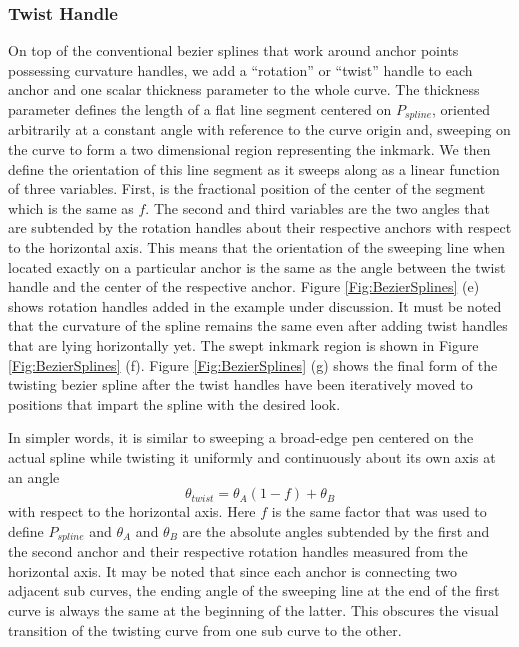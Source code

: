 \subsubsection{Twist Handle}
    On top of the conventional bezier splines that work around anchor points possessing curvature handles, we add a ``rotation'' or ``twist'' handle to each anchor and one scalar thickness parameter to the whole curve. The thickness parameter defines the length of a flat line segment centered on $P_{spline}$, oriented arbitrarily at a constant angle with reference to the curve origin and, sweeping on the curve to form a two dimensional region representing the inkmark. We then define the orientation of this line segment as it sweeps along as a linear function of three variables. First, is the fractional position of the center of the segment which is the same as $f$. The second and third variables are the two angles that are subtended by the rotation handles about their respective anchors with respect to the horizontal axis. This means that the orientation of the sweeping line when located exactly on a particular anchor is the same as the angle between the twist handle and the center of the respective anchor. Figure \ref{Fig:BezierSplines} (e) shows rotation handles added in the example under discussion. It must be noted that the curvature of the spline remains the same even after adding twist handles that are lying horizontally yet. The swept inkmark region is shown in Figure \ref{Fig:BezierSplines} (f). Figure \ref{Fig:BezierSplines} (g) shows the final form of the twisting bezier spline after the twist handles have been iteratively moved to positions that impart the spline with the desired look.

    In simpler words, it is similar to sweeping a broad-edge pen centered on the actual spline while twisting it uniformly and continuously about its own axis at an angle
    \begin{equation}
    \theta_{twist}=\theta_A  (1-f)+ \theta_B
    \end{equation}
    with respect to the horizontal axis. Here $f$ is the same factor that was used to define $P_{spline}$ and $\theta_A$ and $\theta_B$ are the absolute angles subtended by the first and the second anchor and their respective rotation handles measured from the horizontal axis. It may be noted that since each anchor is connecting two adjacent sub curves, the ending angle of the sweeping line at the end of the first curve is always the same at the beginning of the latter. This obscures the visual transition of the twisting curve from one sub curve to the other.

